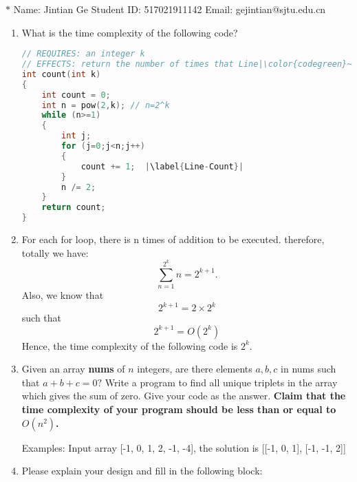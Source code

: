 \documentclass[12pt,a4paper]{article}
\makeatletter
\newtheorem*{solution}{Solution}
\theoremstyle{definition}
\renewenvironment{solution}[1][Solution] {\par\pushQED{\qed}\normalfont\topsep6\p@\@plus6\p@\relax\trivlist\item[\hskip\labelsep\bfseries#1\@addpunct{.}]\ignorespaces}{\popQED\endtrivlist\@endpefalse} \makeatother
\makeatother
\begin{document}
\noindent

\noindent{}
\begin{center}


\footnotesize{\color{blue}$*$ Name: Jintian Ge  \quad Student ID: 517021911142 \quad Email: gejintian@sjtu.edu.cn}
\end{center}


\begin{enumerate}

\item What is the time complexity of the following code?

\begin{lstlisting}[language=C++]
// REQUIRES: an integer k
// EFFECTS: return the number of times that Line|\color{codegreen}~\ref{Line-Count}| is executed
int count(int k)
{
	int count = 0;
	int n = pow(2,k); // n=2^k
	while (n>=1)
	{
		int j;
   		for (j=0;j<n;j++)
   		{
   			count += 1;  |\label{Line-Count}|	
   		}
   		n /= 2;
	}
	return count;
}
\end{lstlisting}



\begin{solution}
For each for loop, there is n times of addition to be executed. therefore, totally we have: $$\sum_{n=1}^{2^k} n = {2^{k+1}}.$$ 
Also, we know that $${2^{k+1}={2\times2^k}}$$ such that $${2^{k+1}=O(2^k)}$$
Hence, the time complexity of the following code is ${2^k}$.
\end{solution}


\item Given an array \textbf{nums} of $n$ integers, are there elements $a, b, c$ in nums such that $a + b + c = 0?$ Write a program to find all unique triplets in the array which gives the sum of zero. Give your code as the answer. \textbf{Claim that the time complexity of your program should be less than or equal to $O(n^2)$.}

{\color{purple}Examples: Input array [-1, 0, 1, 2, -1, -4], the solution is [[-1, 0, 1], [-1, -1, 2]]}



\begin{solution}
Please explain your design and fill in the following block:


\end{solution}
\end{enumerate}
\end{document}

